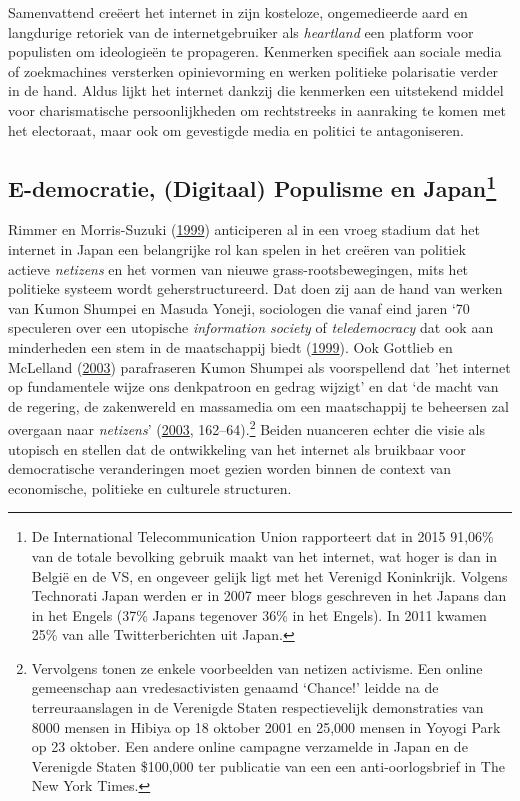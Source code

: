 \documentclass[10.5pt,dutch,]{article}
\begin{document}
Samenvattend creëert het internet in zijn kosteloze, ongemedieerde aard
en langdurige retoriek van de internetgebruiker als \emph{heartland} een
platform voor populisten om ideologieën te propageren. Kenmerken
specifiek aan sociale media of zoekmachines versterken opinievorming en
werken politieke polarisatie verder in de hand. Aldus lijkt het internet
dankzij die kenmerken een uitstekend middel voor charismatische
persoonlijkheden om rechtstreeks in aanraking te komen met het
electoraat, maar ook om gevestigde media en politici te antagoniseren.

\subsection[E-democratie, (Digitaal) Populisme en
Japan]{\texorpdfstring{E-democratie, (Digitaal) Populisme en
Japan\footnote{De International Telecommunication Union rapporteert dat
  in 2015 91,06\% van de totale bevolking gebruik maakt van het
  internet, wat hoger is dan in België en de VS, en ongeveer gelijk ligt
  met het Verenigd Koninkrijk. Volgens Technorati Japan werden er in
  2007 meer blogs geschreven in het Japans dan in het Engels (37\%
  Japans tegenover 36\% in het Engels). In 2011 kwamen 25\% van alle
  Twitterberichten uit Japan.}}{E-democratie, (Digitaal) Populisme en Japan}}\label{e-democratie-digitaal-populisme-en-japan39}

Rimmer en Morris-Suzuki
(\protect\hyperlink{ref-rimmerux5fjapaneseux5f1999}{1999}) anticiperen
al in een vroeg stadium dat het internet in Japan een belangrijke rol
kan spelen in het creëren van politiek actieve \emph{netizens} en het
vormen van nieuwe grass-rootsbewegingen, mits het politieke systeem
wordt geherstructureerd. Dat doen zij aan de hand van werken van Kumon
Shumpei en Masuda Yoneji, sociologen die vanaf eind jaren `70 speculeren
over een utopische \emph{information society} of \emph{teledemocracy}
dat ook aan minderheden een stem in de maatschappij biedt
(\protect\hyperlink{ref-rimmerux5fjapaneseux5f1999}{1999}). Ook Gottlieb
en McLelland
(\protect\hyperlink{ref-gottliebux5fjapaneseux5f2003}{2003})
parafraseren Kumon Shumpei als voorspellend dat 'het internet op
fundamentele wijze ons denkpatroon en gedrag wijzigt' en dat `de macht
van de regering, de zakenwereld en massamedia om een maatschappij te
beheersen zal overgaan naar \emph{netizens}'
(\protect\hyperlink{ref-gottliebux5fjapaneseux5f2003}{2003},
162--64).\footnote{Vervolgens tonen ze enkele voorbeelden van netizen
  activisme. Een online gemeenschap aan vredesactivisten genaamd
  `Chance!' leidde na de terreuraanslagen in de Verenigde Staten
  respectievelijk demonstraties van 8000 mensen in Hibiya op 18 oktober
  2001 en 25,000 mensen in Yoyogi Park op 23 oktober. Een andere online
  campagne verzamelde in Japan en de Verenigde Staten \$100,000 ter
  publicatie van een een anti-oorlogsbrief in The New York Times.}
Beiden nuanceren echter die visie als utopisch en stellen dat de
ontwikkeling van het internet als bruikbaar voor democratische
veranderingen moet gezien worden binnen de context van economische,
politieke en culturele structuren.
\end{document}
